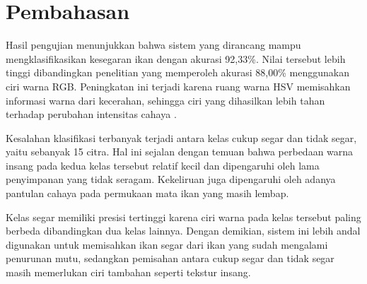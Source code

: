 \section{Pembahasan}

Hasil pengujian menunjukkan bahwa sistem yang dirancang mampu
mengklasifikasikan kesegaran ikan dengan akurasi 92,33\%. Nilai tersebut
lebih tinggi dibandingkan penelitian \citet{prasetyo2021} yang
memperoleh akurasi 88,00\% menggunakan ciri warna RGB. Peningkatan ini
terjadi karena ruang warna HSV memisahkan informasi warna dari
kecerahan, sehingga ciri yang dihasilkan lebih tahan terhadap perubahan
intensitas cahaya \citep{gonzalez2018}.

Kesalahan klasifikasi terbanyak terjadi antara kelas cukup segar dan
tidak segar, yaitu sebanyak 15 citra. Hal ini sejalan dengan temuan
\citet{prasetyo2021} bahwa perbedaan warna insang pada kedua kelas
tersebut relatif kecil dan dipengaruhi oleh lama penyimpanan yang tidak
seragam. Kekeliruan juga dipengaruhi oleh adanya pantulan cahaya pada
permukaan mata ikan yang masih lembap.

Kelas segar memiliki presisi tertinggi karena ciri warna pada kelas
tersebut paling berbeda dibandingkan dua kelas lainnya. Dengan demikian,
sistem ini lebih andal digunakan untuk memisahkan ikan segar dari ikan
yang sudah mengalami penurunan mutu, sedangkan pemisahan antara cukup
segar dan tidak segar masih memerlukan ciri tambahan seperti tekstur
insang.
